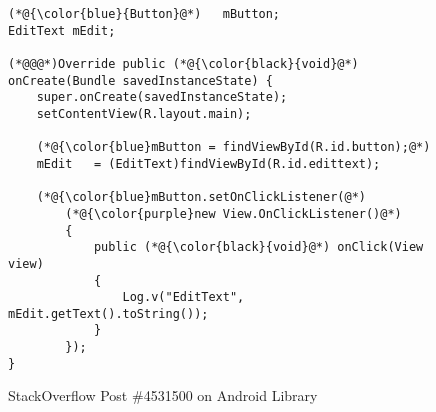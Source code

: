 \begin{figure}[htbp]
	\centering
\begin{lstlisting}[]
(*@{\color{blue}{Button}@*)   mButton;
EditText mEdit;

(*@@@*)Override public (*@{\color{black}{void}@*) onCreate(Bundle savedInstanceState) {
    super.onCreate(savedInstanceState);
    setContentView(R.layout.main);

    (*@{\color{blue}mButton = findViewById(R.id.button);@*)
    mEdit   = (EditText)findViewById(R.id.edittext);

    (*@{\color{blue}mButton.setOnClickListener(@*)
        (*@{\color{purple}new View.OnClickListener()@*)
        {
            public (*@{\color{black}{void}@*) onClick(View view)
            {
                Log.v("EditText", mEdit.getText().toString());
            }
        });
}
\end{lstlisting}
        \vspace{-12pt}
        \caption{StackOverflow Post \#4531500 on Android Library}
        \label{fig:example1}
\end{figure}
